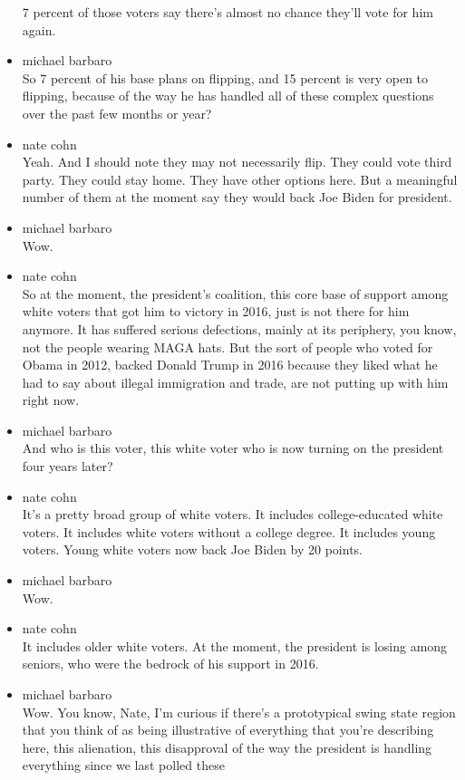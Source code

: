 \begin{itemize}
  7 percent of those voters say there's almost no chance they'll vote
  for him again.
\item
  michael barbaro\\
  So 7 percent of his base plans on flipping, and 15 percent is very
  open to flipping, because of the way he has handled all of these
  complex questions over the past few months or year?
\item
  nate cohn\\
  Yeah. And I should note they may not necessarily flip. They could vote
  third party. They could stay home. They have other options here. But a
  meaningful number of them at the moment say they would back Joe Biden
  for president.
\item
  michael barbaro\\
  Wow.
\item
  nate cohn\\
  So at the moment, the president's coalition, this core base of support
  among white voters that got him to victory in 2016, just is not there
  for him anymore. It has suffered serious defections, mainly at its
  periphery, you know, not the people wearing MAGA hats. But the sort of
  people who voted for Obama in 2012, backed Donald Trump in 2016
  because they liked what he had to say about illegal immigration and
  trade, are not putting up with him right now.
\item
  michael barbaro\\
  And who is this voter, this white voter who is now turning on the
  president four years later?
\item
  nate cohn\\
  It's a pretty broad group of white voters. It includes
  college-educated white voters. It includes white voters without a
  college degree. It includes young voters. Young white voters now back
  Joe Biden by 20 points.
\item
  michael barbaro\\
  Wow.
\item
  nate cohn\\
  It includes older white voters. At the moment, the president is losing
  among seniors, who were the bedrock of his support in 2016.
\item
  michael barbaro\\
  Wow. You know, Nate, I'm curious if there's a prototypical swing state
  region that you think of as being illustrative of everything that
  you're describing here, this alienation, this disapproval of the way
  the president is handling everything since we last polled these

\end{itemize}
